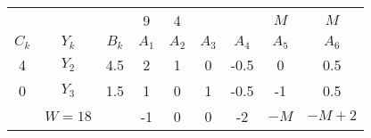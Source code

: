     \begin{tabular}{ccccccccc}
    \hline
    \hline
            &         &         & 9       & 4       &         &         & $M$     & $M$ \bigstrut[t]\\
    $C_k$   & $Y_k$   & $B_k$   & $A_1$   & $A_2$   & $A_3$   & $A_4$   & $A_5$   & $A_6$ \bigstrut[b]\\
    \hline
    4       & $Y_2$   & 4.5     & 2       & 1       & 0       & -0.5    & 0       & 0.5 \bigstrut[t]\\
    0       & $Y_3$   & 1.5     & 1       & 0       & 1       & -0.5    & -1      & 0.5 \bigstrut[b]\\
    \hline
            & $W=18$  &         & -1      & 0       & 0       & -2      & $-M$    & $-M+2$ \bigstrut\\
    \hline
    \hline
    \end{tabular}%
